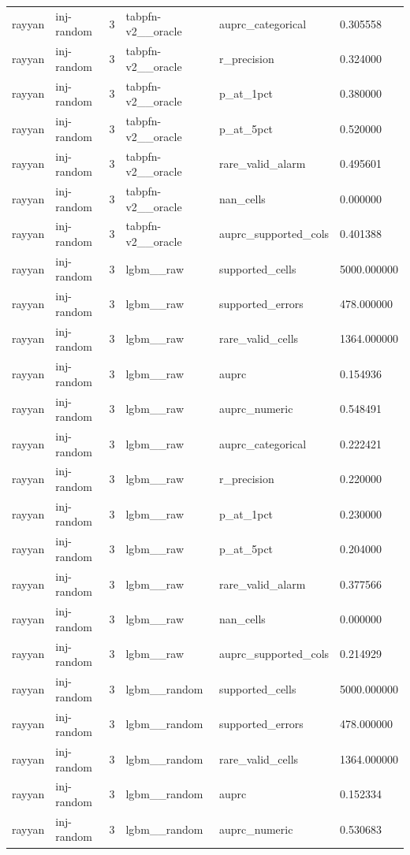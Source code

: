 \begin{tabular}{llllll}
rayyan & inj-random & 3 & tabpfn-v2\_\_oracle & auprc\_categorical & 0.305558 \\
rayyan & inj-random & 3 & tabpfn-v2\_\_oracle & r\_precision & 0.324000 \\
rayyan & inj-random & 3 & tabpfn-v2\_\_oracle & p\_at\_1pct & 0.380000 \\
rayyan & inj-random & 3 & tabpfn-v2\_\_oracle & p\_at\_5pct & 0.520000 \\
rayyan & inj-random & 3 & tabpfn-v2\_\_oracle & rare\_valid\_alarm & 0.495601 \\
rayyan & inj-random & 3 & tabpfn-v2\_\_oracle & nan\_cells & 0.000000 \\
rayyan & inj-random & 3 & tabpfn-v2\_\_oracle & auprc\_supported\_cols & 0.401388 \\
rayyan & inj-random & 3 & lgbm\_\_raw & supported\_cells & 5000.000000 \\
rayyan & inj-random & 3 & lgbm\_\_raw & supported\_errors & 478.000000 \\
rayyan & inj-random & 3 & lgbm\_\_raw & rare\_valid\_cells & 1364.000000 \\
rayyan & inj-random & 3 & lgbm\_\_raw & auprc & 0.154936 \\
rayyan & inj-random & 3 & lgbm\_\_raw & auprc\_numeric & 0.548491 \\
rayyan & inj-random & 3 & lgbm\_\_raw & auprc\_categorical & 0.222421 \\
rayyan & inj-random & 3 & lgbm\_\_raw & r\_precision & 0.220000 \\
rayyan & inj-random & 3 & lgbm\_\_raw & p\_at\_1pct & 0.230000 \\
rayyan & inj-random & 3 & lgbm\_\_raw & p\_at\_5pct & 0.204000 \\
rayyan & inj-random & 3 & lgbm\_\_raw & rare\_valid\_alarm & 0.377566 \\
rayyan & inj-random & 3 & lgbm\_\_raw & nan\_cells & 0.000000 \\
rayyan & inj-random & 3 & lgbm\_\_raw & auprc\_supported\_cols & 0.214929 \\
rayyan & inj-random & 3 & lgbm\_\_random & supported\_cells & 5000.000000 \\
rayyan & inj-random & 3 & lgbm\_\_random & supported\_errors & 478.000000 \\
rayyan & inj-random & 3 & lgbm\_\_random & rare\_valid\_cells & 1364.000000 \\
rayyan & inj-random & 3 & lgbm\_\_random & auprc & 0.152334 \\
rayyan & inj-random & 3 & lgbm\_\_random & auprc\_numeric & 0.530683 \\

\end{tabular}
